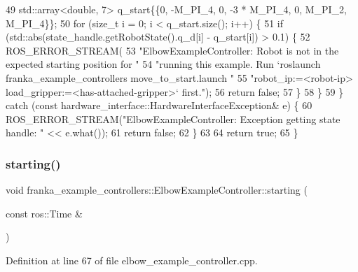 \begin{DoxyCode}
49     std::array<double, 7> q\_start\{\{0, -M\_PI\_4, 0, -3 * M\_PI\_4, 0, M\_PI\_2, M\_PI\_4\}\};
50     \textcolor{keywordflow}{for} (\textcolor{keywordtype}{size\_t} i = 0; i < q\_start.size(); i++) \{
51       \textcolor{keywordflow}{if} (std::abs(state\_handle.getRobotState().q\_d[i] - q\_start[i]) > 0.1) \{
52         ROS\_ERROR\_STREAM(
53             \textcolor{stringliteral}{"ElbowExampleController: Robot is not in the expected starting position for "}
54             \textcolor{stringliteral}{"running this example. Run `roslaunch franka\_example\_controllers move\_to\_start.launch "}
55             \textcolor{stringliteral}{"robot\_ip:=<robot-ip> load\_gripper:=<has-attached-gripper>` first."});
56         \textcolor{keywordflow}{return} \textcolor{keyword}{false};
57       \}
58     \}
59   \} \textcolor{keywordflow}{catch} (\textcolor{keyword}{const} hardware\_interface::HardwareInterfaceException& e) \{
60     ROS\_ERROR\_STREAM(\textcolor{stringliteral}{"ElbowExampleController: Exception getting state handle: "} << e.what());
61     \textcolor{keywordflow}{return} \textcolor{keyword}{false};
62   \}
63 
64   \textcolor{keywordflow}{return} \textcolor{keyword}{true};
65 \}
\end{DoxyCode}
\mbox{\label{classfranka__example__controllers_1_1ElbowExampleController_a0ed0bd6a0db321eda30ddf0f038021df}} 
\subsubsection{\texorpdfstring{starting()}{starting()}}
{\footnotesize\ttfamily void franka\+\_\+example\+\_\+controllers\+::\+Elbow\+Example\+Controller\+::starting (\begin{DoxyParamCaption}\item[{const ros\+::\+Time \&}]{ }\end{DoxyParamCaption})\hspace{0.3cm}{\ttfamily [override]}}



Definition at line 67 of file elbow\+\_\+example\+\_\+controller.\+cpp.



